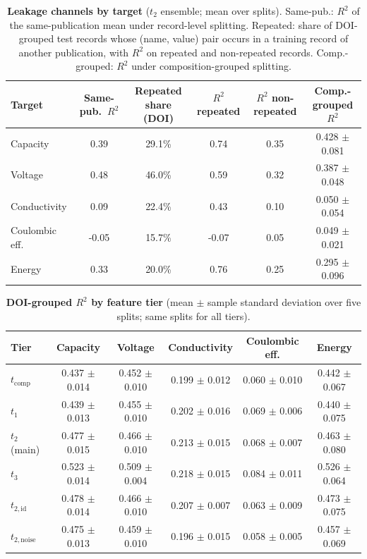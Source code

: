 \documentclass[3p]{elsarticle}
\begin{document}
\clearpage
\begin{table}[H]
    \centering\small
    \caption{\textbf{Leakage channels by target} ($t_2$ ensemble; mean over splits). Same-pub.: $R^2$ of the same-publication mean under record-level splitting. Repeated: share of DOI-grouped test records whose (name, value) pair occurs in a training record of another publication, with $R^2$ on repeated and non-repeated records. Comp.-grouped: $R^2$ under composition-grouped splitting.}
    \label{tab:channels}
    \begin{tabular}{@{}lccccc@{}}
        \toprule
        Target & Same-pub.\ $R^2$ & Repeated share (DOI) & $R^2$ repeated & $R^2$ non-repeated & Comp.-grouped $R^2$ \\
        \midrule
        Capacity       & 0.39 & 29.1\% & 0.74 & 0.35 & 0.428 $\pm$ 0.081 \\
        Voltage        & 0.48 & 46.0\% & 0.59 & 0.32 & 0.387 $\pm$ 0.048 \\
        Conductivity   & 0.09 & 22.4\% & 0.43 & 0.10 & 0.050 $\pm$ 0.054 \\
        Coulombic eff. & -0.05 & 15.7\% & -0.07 & 0.05 & 0.049 $\pm$ 0.021 \\
        Energy         & 0.33 & 20.0\% & 0.76 & 0.25 & 0.295 $\pm$ 0.096 \\
        \bottomrule
    \end{tabular}
\end{table}

\clearpage
\begin{table}[H]
    \centering\small
    \caption{\textbf{DOI-grouped $R^2$ by feature tier} (mean $\pm$ sample standard deviation over five splits; same splits for all tiers).}
    \label{tab:tiers}
    \begin{tabular}{@{}lccccc@{}}
        \toprule
        Tier & Capacity & Voltage & Conductivity & Coulombic eff. & Energy \\
        \midrule
        $t_{\mathrm{comp}}$     & 0.437 $\pm$ 0.014 & 0.452 $\pm$ 0.010 & 0.199 $\pm$ 0.012 & 0.060 $\pm$ 0.010 & 0.442 $\pm$ 0.067 \\
        $t_1$                   & 0.439 $\pm$ 0.013 & 0.455 $\pm$ 0.010 & 0.202 $\pm$ 0.016 & 0.069 $\pm$ 0.006 & 0.440 $\pm$ 0.075 \\
        $t_2$ (main)            & 0.477 $\pm$ 0.015 & 0.466 $\pm$ 0.010 & 0.213 $\pm$ 0.015 & 0.068 $\pm$ 0.007 & 0.463 $\pm$ 0.080 \\
        $t_3$                   & 0.523 $\pm$ 0.014 & 0.509 $\pm$ 0.004 & 0.218 $\pm$ 0.015 & 0.084 $\pm$ 0.011 & 0.526 $\pm$ 0.064 \\
        $t_{2,\mathrm{id}}$     & 0.478 $\pm$ 0.014 & 0.466 $\pm$ 0.010 & 0.207 $\pm$ 0.007 & 0.063 $\pm$ 0.009 & 0.473 $\pm$ 0.075 \\
        $t_{2,\mathrm{noise}}$  & 0.475 $\pm$ 0.013 & 0.459 $\pm$ 0.010 & 0.196 $\pm$ 0.015 & 0.058 $\pm$ 0.005 & 0.457 $\pm$ 0.069 \\
        \bottomrule
    \end{tabular}
\end{table}
\end{document}
